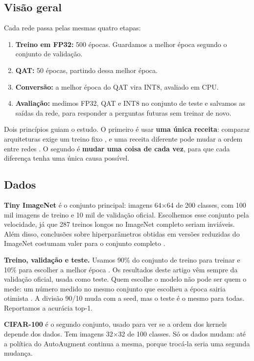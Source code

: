 \documentclass[conference]{IEEEtran}
\newcommand{\by}{\ensuremath{\times}}
\begin{document}
\subsection{Visão geral}

Cada rede passa pelas mesmas quatro etapas:
\begin{enumerate}
\item \textbf{Treino em FP32:} 500 épocas. Guardamos a melhor época segundo o conjunto de validação.
\item \textbf{QAT:} 50 épocas, partindo dessa melhor época.
\item \textbf{Conversão:} a melhor época do QAT vira INT8, avaliado em CPU.
\item \textbf{Avaliação:} medimos FP32, QAT e INT8 no conjunto de teste e salvamos as saídas da rede, para responder a perguntas futuras sem treinar de novo.
\end{enumerate}

Dois princípios guiam o estudo. O primeiro é usar \textbf{uma única receita}: comparar arquiteturas exige um treino fixo \cite{radosavovic2019network}, e
uma receita diferente pode mudar a ordem entre redes \cite{bello2021revisiting,wightman2021resnet}. O segundo é \textbf{mudar uma coisa de cada vez}, para que
cada diferença tenha uma única causa possível.

\subsection{Dados}

\textbf{Tiny ImageNet} \cite{le2015tiny} é o conjunto principal: imagens 64\by64 de 200 classes, com 100 mil imagens de treino e 10 mil de validação oficial.
Escolhemos esse conjunto pela velocidade, já que 287 treinos longos no ImageNet completo seriam inviáveis. Além disso, conclusões sobre hiperparâmetros
obtidas em versões reduzidas do ImageNet costumam valer para o conjunto completo \cite{chrabaszcz2017downsampled}.

\textbf{Treino, validação e teste.} Usamos 90\% do conjunto de treino para treinar e 10\% para escolher a melhor época \cite{he2016deep}. Os resultados
deste artigo vêm sempre da validação oficial, usada como teste. Quem escolhe o modelo não pode ser quem o mede: um número medido no mesmo conjunto que
escolheu a época sairia otimista \cite{cawley2010overfitting}. A divisão 90/10 muda com a seed, mas o teste é o mesmo para todas. Reportamos a acurácia top-1.

\textbf{CIFAR-100} \cite{krizhevsky2009learning} é o segundo conjunto, usado para ver se a ordem dos kernels depende dos dados. Tem imagens 32\by32 de 100 classes.
Só os dados mudam: até a política do AutoAugment continua a mesma, porque trocá-la seria uma segunda mudança.
\end{document}
